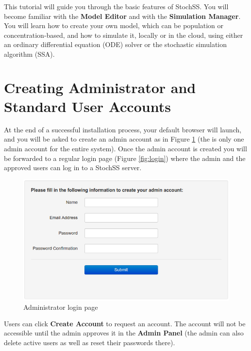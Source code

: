 This tutorial will guide you through the basic features of StochSS. You will become familiar with the \textbf{Model Editor} and with the \textbf{Simulation Manager}. You will learn how to create your own model, which can be population or concentration-based, and how to simulate it, locally or in the cloud, using either an ordinary differential equation (ODE) solver or the stochastic simulation algorithm (SSA).

\section{\label{sec:acc} Creating Administrator and Standard User Accounts}
At the end of a successful installation process, your default browser will launch, and you will be asked to create an admin account as in Figure \ref{fig:admin} (the is only one admin account for the entire system).
Once the admin account is created you will be forwarded to a regular login page (Figure \ref{fig:login}) where the admin and the approved users can log in to a StochSS server.

\begin{figure}[!htb]
\centering
\includegraphics[scale=0.64]{T1/admin.png}
\caption{Administrator login page}
\label{fig:admin}
\end{figure}

Users can click \textbf{Create Account} to request an account.
The account will not be accessible until the admin approves it in the \textbf{Admin Panel} (the admin can also delete active users as well as reset their passwords there).

